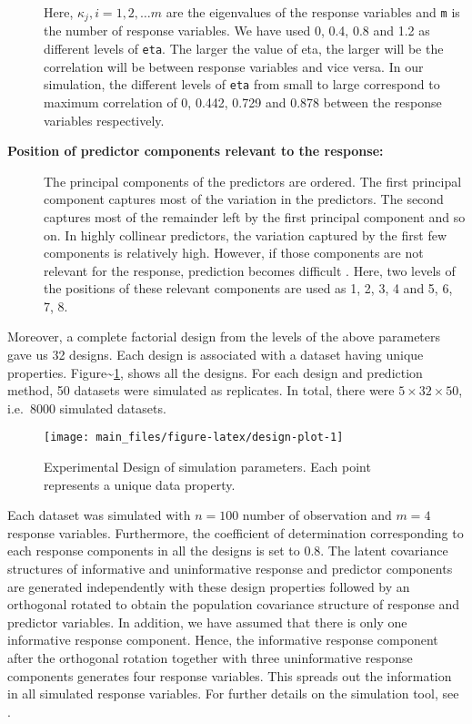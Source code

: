 \documentclass[review]{elsarticle}
\providecommand{\tightlist}{%
  \setlength{\itemsep}{0pt}\setlength{\parskip}{0pt}}
\begin{document}
\begin{description}
Here, \(\kappa_j, i = 1, 2, \ldots m\) are the eigenvalues of the response variables and \texttt{m} is the number of response variables. We have used 0, 0.4, 0.8 and 1.2 as different levels of \texttt{eta}. The larger the value of eta, the larger will be the correlation will be between response variables and vice versa. In our simulation, the different levels of \texttt{eta} from small to large correspond to maximum correlation of 0, 0.442, 0.729 and 0.878 between the response variables respectively.
\item[\textbf{Position of predictor components relevant to the response:}]
The principal components of the predictors are ordered. The first principal component captures most of the variation in the predictors. The second captures most of the remainder left by the first principal component and so on. In highly collinear predictors, the variation captured by the first few components is relatively high. However, if those components are not relevant for the response, prediction becomes difficult \citep{Helland1994b}. Here, two levels of the positions of these relevant components are used as 1, 2, 3, 4 and 5, 6, 7, 8.
\end{description}

Moreover, a complete factorial design from the levels of the above parameters gave us 32 designs. Each design is associated with a dataset having unique properties. Figure\textasciitilde\ref{fig:design-plot}, shows all the designs. For each design and prediction method, 50 datasets were simulated as replicates. In total, there were \(5 \times 32 \times 50\), i.e.~8000 simulated datasets.

\begin{figure}
\texttt{[image: main\_files/figure-latex/design-plot-1]} \caption{Experimental Design of simulation parameters. Each point represents a unique data property.}\label{fig:design-plot}
\end{figure}

\begin{description}
\tightlist
\item[\textbf{Common parameters:}]
Each dataset was simulated with \(n = 100\) number of observation and \(m = 4\) response variables. Furthermore, the coefficient of determination corresponding to each response components in all the designs is set to 0.8. The latent covariance structures of informative and uninformative response and predictor components are generated independently with these design properties followed by an orthogonal rotated to obtain the population covariance structure of response and predictor variables. In addition, we have assumed that there is only one informative response component. Hence, the informative response component after the orthogonal rotation together with three uninformative response components generates four response variables. This spreads out the information in all simulated response variables. For further details on the simulation tool, see \citep{Rimal2018}.
\end{description}
\end{document}
